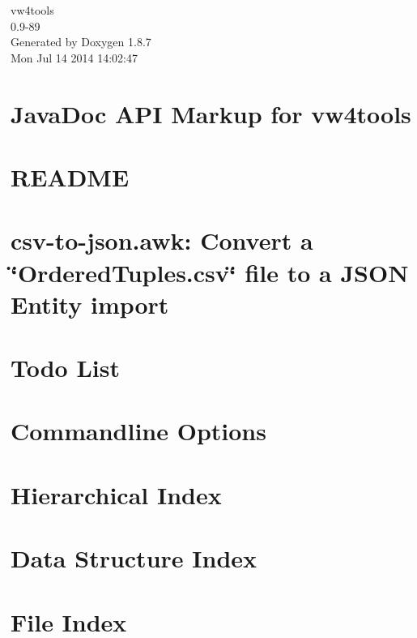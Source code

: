 \documentclass[twoside]{book}
\newcommand{\+}{\discretionary{\mbox{\scriptsize$\hookleftarrow$}}{}{}}
\newcommand{\clearemptydoublepage}{%
  \newpage{\pagestyle{empty}\cleardoublepage}%
}
\begin{document}
\begin{titlepage}
\vspace*{7cm}
\begin{center}%
{\Large vw4tools \\[1ex]\large 0.\+9-\/89 }\\
\vspace*{1cm}
{\large Generated by Doxygen 1.8.7}\\
\vspace*{0.5cm}
{\small Mon Jul 14 2014 14:02:47}\\
\end{center}
\end{titlepage}
\clearemptydoublepage
\tableofcontents
\clearemptydoublepage
{}

\chapter{Java\+Doc A\+P\+I Markup for vw4tools}
\label{index}
\chapter{R\+E\+A\+D\+M\+E}
\label{md_htdocs_README}

\chapter{csv-\/to-\/json.awk\+: Convert a \char`\"{}\+Ordered\+Tuples.\+csv\char`\"{} file to a J\+S\+O\+N Entity import}
\label{csv-to-json}

\chapter{Todo List}
\label{todo}

\chapter{Commandline Options}
\label{cmdopt}

\chapter{Hierarchical Index}

\chapter{Data Structure Index}

\chapter{File Index}

\end{document}
